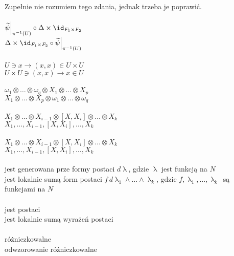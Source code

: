 \documentclass[a4paper,11pt]{article}
\numberwithin{equation}{section}
\renewcommand{\lambda}{\uplambda}
\begin{document}
 \\
Zupełnie nie rozumiem tego zdania, jednak trzeba je poprawić. \\
 \\[0.3em]
\Jest  $\widetilde{ \psi }\Big|_{ \pi^{ -1 }( U ) }
\circ \Delta \times \id_{ F_{ 1 } \times F_{ 2 } }$ \\[0.3em]
\Powin $\Delta \times \id_{ F_{ 1 } \times F_{ 2 } }
\circ \widetilde{ \psi }\Big|_{ \pi^{ -1 }( U ) }$ \\
 \\
\Jest  $U \ni x \to ( x, x ) \in U \times U$ \\[0.2em]
\Powin $U \times U \ni ( x, x ) \to x \in U$ \\
 \\
\Jest  $\omega_{ 1 } \otimes \ldots \otimes \omega_{ q } \otimes X_{ 1 }
\otimes \ldots \otimes X_{ p }$ \\
\Powin $X_{ 1 } \otimes \ldots \otimes X_{ p } \otimes \omega_{ 1 }
\otimes \ldots \otimes \omega_{ q }$ \\
 \\
\Jest  $X_{ 1 } \otimes \ldots \otimes X_{ i - 1 } \otimes [ X, X_{ i } ]
\otimes \ldots \otimes X_{ k }$ \\
\Powin $X_{ 1 }, \ldots, X_{ i - 1 }, [ X, X_{ i } ], \ldots, X_{ k }$ \\
 \\
\Jest  $X_{ 1 } \otimes \ldots \otimes X_{ i - 1 } \otimes [ X, X_{ i } ]
\otimes \ldots \otimes X_{ k }$ \\
\Powin $X_{ 1 }, \ldots, X_{ i - 1 }, [ X, X_{ i } ], \ldots, X_{ k }$ \\
 \\
\Jest  jest generowana prze formy postaci $d \lambda$, gdzie $\lambda$
jest funkcją na $N$ \\
\Powin jest lokalnie sumą form postaci
$f\, d\lambda_{ 1 } \wedge \ldots \wedge \lambda_{ k }$, gdzie
$f, \lambda_{ 1 }, \ldots, \lambda_{ k }$~są funkcjami na $N$ \\
 \\
\Jest  jest postaci \\
\Powin jest lokalnie sumą wyrażeń postaci \\
 \\
\Jest  różniczkowalne \\
\Powin odwzorowanie różniczkowalne \\
\end{document}
